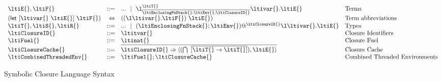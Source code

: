 \begin{figure}
$$
\begin{array}{lrll}
  \ltiE{}, \ltiF{} &::=& ... \alt
                         \ltifunelab{\ltiT{}}
                                    {\ova{\ltiufunelabentry{\ltiEnclosingFnStack{}}
                                                            {\ltiEnv{}}
                                                            {\ltiClosureID{}}}}
                                     {\ltivar{}}
                                     {\ltiE{}}
                      &\mbox{Terms} \\
  \ltilet{\ltivar{}}{\ltiE{}}{\ltiF{}} &\Leftrightarrow& \ltiapp{(\ltiufun{\ltivar{}}{\ltiF{}})}{\ltiE{}}
                      &\mbox{Term abbreviations} \\
  \ltiT{}, \ltiS{}, \ltiR{} &::=& ...
                         \alt \ltiClosureWithStkID{\ltiEnclosingFnStack{}}{\ltiEnv{}}{\ltiClosureID{}}{\ltiufun{\ltivar{}}{\ltiE{}}}
                      &\mbox{Types} \\
  \ltiClosureID{} &::=& \ltitvar{}
                      &\mbox{Closure Identifiers} \\
  \ltiFuel{} &::=& \ltinat{}
                      &\mbox{Closure Fuel} \\
  \ltiClosureCache{} &::=& \ova{\ltiClosureID{} \Rightarrow {\ltiClosureCacheVal{\ltiIFn{\ova{\ltiFn{\ltiT{}}{\ltiT{}}}}}{\ltiE{}}}}
                      &\mbox{Closure Cache} \\
  \ltiCombinedThreadedEnv{} &::=& \ltimakeCombinedThreadedEnv{\ltiFuel{}}{\ltiClosureCache{}}
                      &\mbox{Combined Threaded Environments} \\
\end{array}
$$
\caption{Symbolic Closure Language Syntax}
\label{symbolic:figure:SC-language-syntax}
\end{figure}

